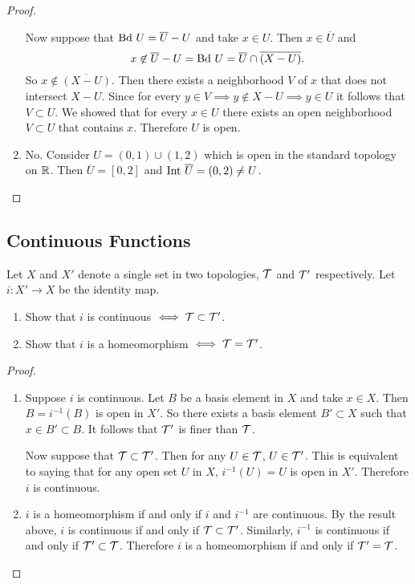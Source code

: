\begin{proof}
\begin{enumerate}
            Now suppose that $\text{Bd } U = \overline{U}-U$ and take $x\in U$. Then $x\in\overline{U}$ and
                $$x\not\in \overline{U}-U=\text{Bd } U=\overline{U}\cap\overline{\left(X-U\right)}.$$
            So $x\not\in\overline{\left(X-U\right)}$. Then there exists a neighborhood $V$ of $x$ that does not intersect $X-U$.
            Since for every $y\in V\implies y\not\in X-U\implies y\in U$ it follows that $V\subset U$.
            We showed that for every $x\in U$ there exists an open neighborhood $V\subset U$ that contains $x$. Therefore $U$ is open.
        \item No. Consider $U=(0,1)\cup(1,2)$ which is open in the standard topology on $\mathbb{R}$.
            Then $\overline{U}=[0,2]$ and $\text{Int }\overline{U}=(0,2)\neq U$.
   \end{enumerate} 
\end{proof}
\subsection{Continuous Functions}
\begin{ex}{18.3}
    Let $X$ and $X'$ denote a single set in two topologies, $\mathcal{T}$ and $\mathcal{T}'$ respectively.
    Let $i:X'\to X$ be the identity map.
    \begin{enumerate}
        \item Show that $i$ is continuous $\iff\mathcal{T}\subset\mathcal{T}'$.
        \item Show that $i$ is a homeomorphism $\iff\mathcal{T}=\mathcal{T}'$.
    \end{enumerate}    
\end{ex}
\begin{proof}
    ${}$
    \begin{enumerate}
        \item Suppose $i$ is continuous. Let $B$ be a basis element in $X$ and take $x\in X$. 
            Then $B=i^{-1}(B)$ is open in $X'$. So there exists a basis element $B'\subset X$ such that $x\in B'\subset B$.
            It follows that $\mathcal{T}'$ is finer than $\mathcal{T}$.

            Now suppose that $\mathcal{T}\subset\mathcal{T}'$. Then for any $U\in\mathcal{T}$, $U\in\mathcal{T}'$. 
            This is equivalent to saying that for any open set $U$ in $X$, $i^{-1}(U)=U$ is open in $X'$.
            Therefore $i$ is continuous.
        \item $i$ is a homeomorphism if and only if $i$ and $i^{-1}$ are continuous.
            By the result above, $i$ is continuous if and only if $\mathcal{T}\subset\mathcal{T}'$. 
            Similarly, $i^{-1}$ is continuous if and only if $\mathcal{T}'\subset\mathcal{T}$. 
            Therefore $i$ is a homeomorphism if and only if $\mathcal{T}'=\mathcal{T}$.
    \end{enumerate}
\end{proof}
